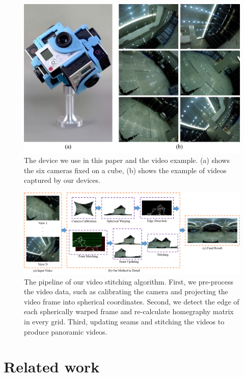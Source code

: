 \documentclass[conference]{IEEEtran}
\begin{document}
\begin{figure}[t]
\centering
\includegraphics[scale=0.36]{picture34.png}
\caption{The device we use in this paper and the video example. (a) shows the six cameras fixed on a cube, (b) shows the example of videos captured by our devices.}
\label{fig:equipment}
\end{figure}

\begin{figure}
\centering
\includegraphics[scale=0.53]{picture44.png}
\caption{The pipeline of our video stitching algorithm. First, we pre-process the video data, such as calibrating the camera
and projecting the video frame into spherical coordinates. Second, we detect the edge of each spherically
warped frame and re-calculate
homegraphy matrix in every grid. Third, updating seams and stitching the videos to produce panoramic videos.}
\label{fig:res}
\end{figure}

\section{Related work}
\label{sec:related}
\end{document}
